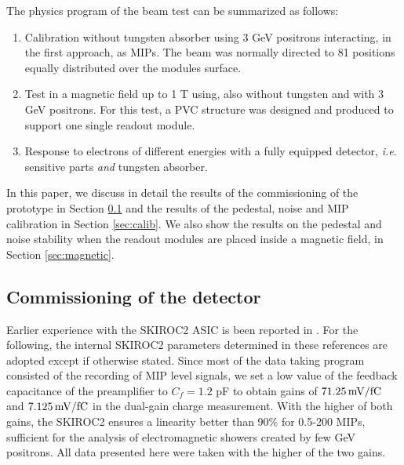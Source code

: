 \documentclass[final,3p,times,twocolumn]{elsarticle}
\begin{document}
The physics program of the beam test can be summarized as follows:

\begin{enumerate}
\item Calibration without tungsten absorber using 3 GeV positrons interacting, in the first approach, as MIPs.
  The beam was normally directed to 81 positions equally distributed over the modules surface.
\item Test in a magnetic field up to 1 T using, also without tungsten and with 3 GeV positrons. For this test, a PVC structure was
designed and produced to support one single readout module.	
\item Response to electrons of different energies with a fully equipped detector, {\it i.e}\@. sensitive parts {\it and} tungsten absorber. 
\end{enumerate}

In this paper, we discuss in detail the results of the commissioning of the prototype in Section \ref{sec:commissioning}
and the results of the pedestal, noise and MIP calibration in Section \ref{sec:calib}.
We also show the results on the pedestal and noise stability when the readout modules are placed inside
a magnetic field, in Section \ref{sec:magnetic}. %

\subsection{Commissioning of the detector}
\label{sec:commissioning}

Earlier experience with the SKIROC2 ASIC is been reported in \cite{Amjad:2014tha,Balagura:2017pka,Suehara:2018mqk}. 
For the following, the internal SKIROC2 parameters determined in these references are adopted
except if otherwise stated.
Since most of the data taking program consisted of the recording
of MIP level signals, we set a low value of the feedback capacitance of the preamplifier to $C_{f}=1.2$ pF  to obtain
gains of $71.25\,{\rm mV/fC}$ and $7.125\,{\rm mV/fC}$ in the dual-gain charge measurement.
With the higher of both gains, the SKIROC2 ensures a linearity better than 90\% 
for 0.5-200 MIPs, sufficient for
the analysis of electromagnetic showers created by few GeV positrons. All data presented here
were taken with the higher of the two gains.
\end{document}
